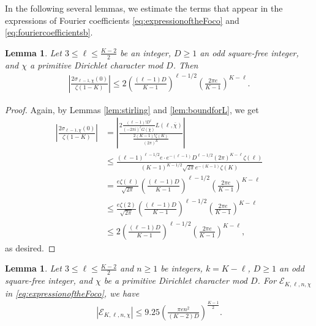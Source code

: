 \documentclass[11pt,letterpaper,reqno]{amsart}
\numberwithin{figure}{section}
\numberwithin{table}{section}
\theoremstyle{definition}
\theoremstyle{plain}
\newtheorem{lemma}[theorem]{Lemma}
\theoremstyle{definition}
\theoremstyle{definition}
\theoremstyle{remark}
\numberwithin{equation}{section}
\theoremstyle{remark}
\begin{document}
In the following several lemmas, we estimate the terms that appear in the expressions of Fourier coefficients \eqref{eq:expressionoftheFoco} and \eqref{eq:fouriercoefficientsb}.
\begin{lemma}\label{lem:bdquotientLandzeta}
    Let $3\leq\ell\leq\frac{K-2}{2}$ be an integer, $D\geq1$ an odd square-free integer, and $\chi$ a primitive Dirichlet character mod $D$. Then
    \begin{align*}
        \left|\frac{2\sigma_{\ell-1,\chi}(0)}{\zeta(1-K) }\right|\leq 2\left(\frac{(\ell-1)D}{K-1}\right)^{\ell-1/2}\left(\frac{2\pi e}{K-1}\right)^{K-\ell}.
    \end{align*}
\end{lemma}
\begin{proof}
    Again, by Lemmas \ref{lem:stirling} and \ref{lem:boundforL}, we get
    \begin{align}
          \left|\frac{2\sigma_{\ell-1,\chi}(0)}{\zeta(1-K) }\right|&=\left|\frac{2\frac{(\ell-1)!D^{\ell}}{(-2\pi i)^{\ell}G(\overline{\chi})}L(\ell,\overline{\chi})}{\frac{2(K-1)!\zeta(K)}{(2\pi)^K}}\right|
          \nonumber\\&\leq\frac{(\ell-1)^{\ell-1/2}e\cdot e^{-(\ell-1)}D^{\ell-1/2}(2\pi)^{K-\ell}\zeta(\ell)}{(K-1)^{K-1/2}\sqrt{2\pi}e^{-(K-1)}\zeta(K)}  \nonumber\\&=\frac{e\zeta(\ell)}{\sqrt{2\pi}}\left(\frac{(\ell-1)D}{K-1}\right)^{\ell-1/2}\left(\frac{2\pi e}{K-1}\right)^{K-\ell}\label{eq:accuratebdquotientzetaandL}\\&\leq\frac{e\zeta(2)}{\sqrt{2\pi}}\left(\frac{(\ell-1)D}{K-1}\right)^{\ell-1/2}\left(\frac{2\pi e}{K-1}\right)^{K-\ell}  \nonumber\\&\leq2\left(\frac{(\ell-1)D}{K-1}\right)^{\ell-1/2}\left(\frac{2\pi e}{K-1}\right)^{K-\ell},  \nonumber
    \end{align}
        as desired.
\end{proof}
\begin{lemma}\label{lem:bdsmalltermprod}
   Let $3\leq\ell\leq\frac{K-2}{2}$ and $n\ge1$ be integers, $k=K-\ell$, $D\geq1$ an odd square-free integer, and $\chi$ be a primitive Dirichlet character mod $D$. For $\mathcal{E}_{K,\ell,n,\chi}$ in \eqref{eq:expressionoftheFoco}, we have
    \begin{align*}
    |\mathcal{E}_{K,\ell,n,\chi}|\leq9.25\left(\frac{\pi en^2}{(K-2)D}\right)^{\frac{K-1}{2}}.
    \end{align*}
\end{lemma}
\end{document}
